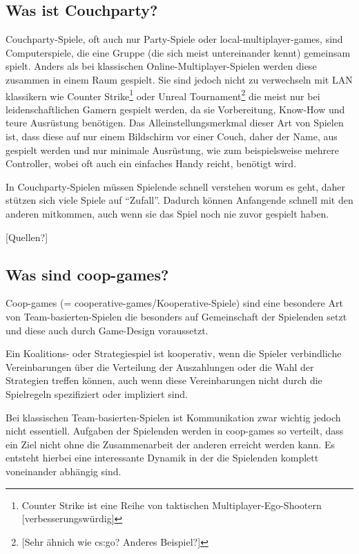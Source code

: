 \subsection{Was ist Couchparty?}

Couchparty-Spiele, oft auch nur Party-Spiele oder local-multiplayer-games, sind Computerspiele, die eine Gruppe (die sich meist untereinander kennt) gemeinsam spielt. Anders als bei klassischen Online-Multiplayer-Spielen werden diese zusammen in einem Raum gespielt. Sie sind jedoch nicht zu verwechseln mit LAN klassikern wie Counter Strike\footnote{Counter Strike ist eine Reihe von taktischen Multiplayer-Ego-Shootern [verbesserungswürdig]} oder Unreal Tournament\footnote{[Sehr ähnich wie cs:go? Anderes Beispiel?]} die meist nur bei leidenschaftlichen Gamern gespielt werden, da sie Vorbereitung, Know-How und teure Ausrüstung benötigen. Das Alleinstellungsmerkmal dieser Art von Spielen ist, dass diese auf nur einem Bildschirm vor einer Couch, daher der Name, aus gespielt werden und nur minimale Ausrüstung, wie zum beispielsweise mehrere Controller, wobei oft auch ein einfaches Handy reicht, benötigt wird.

In Couchparty-Spielen müssen Spielende schnell verstehen worum es geht, daher stützen sich viele Spiele auf "`Zufall"'. Dadurch können Anfangende schnell mit den anderen mitkommen, auch wenn sie das Spiel noch nie zuvor gespielt haben.

[Quellen?]

\subsection{Was sind coop-games?}

Coop-games (= cooperative-games/Kooperative-Spiele) sind eine besondere Art von Team-basierten-Spielen die besonders auf Gemeinschaft der Spielenden setzt und diese auch durch Game-Design voraussetzt. 

Ein Koalitions- oder Strategiespiel ist kooperativ, wenn die Spieler verbindliche Vereinbarungen über die Verteilung der Auszahlungen oder die Wahl der Strategien treffen können, auch wenn diese Vereinbarungen nicht durch die Spielregeln spezifiziert oder impliziert sind.\cite{_introduction_to_the_theory_of_cooperative_games}

Bei klassischen Team-basierten-Spielen ist Kommunikation zwar wichtig jedoch nicht essentiell. Aufgaben der Spielenden werden in coop-games so verteilt, dass ein Ziel nicht ohne die Zusammenarbeit der anderen erreicht werden kann. Es entsteht hierbei eine interessante Dynamik in der die Spielenden komplett voneinander abhängig sind. 

